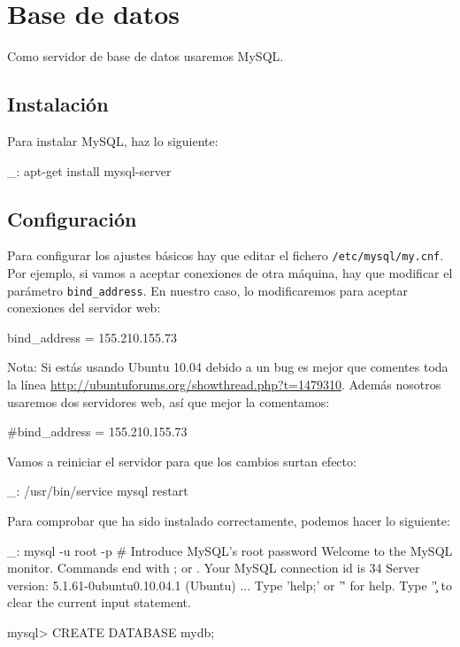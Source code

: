 \chapter{Base de datos}
\label{web:basedatos}

Como servidor de base de datos usaremos MySQL.


\section{Instalación}

Para instalar MySQL, haz lo siguiente:

\begin{bashcode}
_: apt-get install mysql-server
\end{bashcode}


\section{Configuración}

Para configurar los ajustes básicos hay que editar el fichero \texttt{/etc/mysql/my.cnf}. Por ejemplo, si vamos a aceptar conexiones de otra máquina, hay que modificar el parámetro \texttt{bind\_address}. En nuestro caso, lo modificaremos para aceptar conexiones del servidor web:

\begin{bashcode}
bind_address = 155.210.155.73
\end{bashcode}

Nota: Si estás usando Ubuntu 10.04 debido a un bug es mejor que comentes toda la línea \url{http://ubuntuforums.org/showthread.php?t=1479310}. Además nosotros usaremos dos servidores web, así que mejor la comentamos:

\begin{bashcode}
#bind_address = 155.210.155.73
\end{bashcode}

Vamos a reiniciar el servidor para que los cambios surtan efecto:

\begin{bashcode}
_: /usr/bin/service mysql restart
\end{bashcode}

Para comprobar que ha sido instalado correctamente, podemos hacer lo siguiente:

\begin{bashcode}
_: mysql -u root -p     # Introduce MySQL's root password
Welcome to the MySQL monitor.  Commands end with ; or \g.
Your MySQL connection id is 34
Server version: 5.1.61-0ubuntu0.10.04.1 (Ubuntu)
...
Type 'help;' or '\h' for help. Type '\c' to clear the current input statement.

mysql> CREATE DATABASE mydb;
\end{bashcode}


